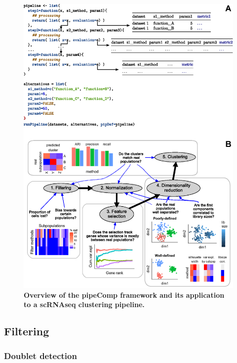 \documentclass{bmcart}
\begin{document}
\begin{figure}
    \centering
    \includegraphics[width=\textwidth,keepaspectratio]{figure0}
    \caption{\textbf{Overview of the pipeComp framework and its application to a scRNAseq clustering pipeline.}}
    \label{fig:figure2}
\end{figure}

\subsection*{Filtering}

\subsubsection*{Doublet detection}
\end{document}
